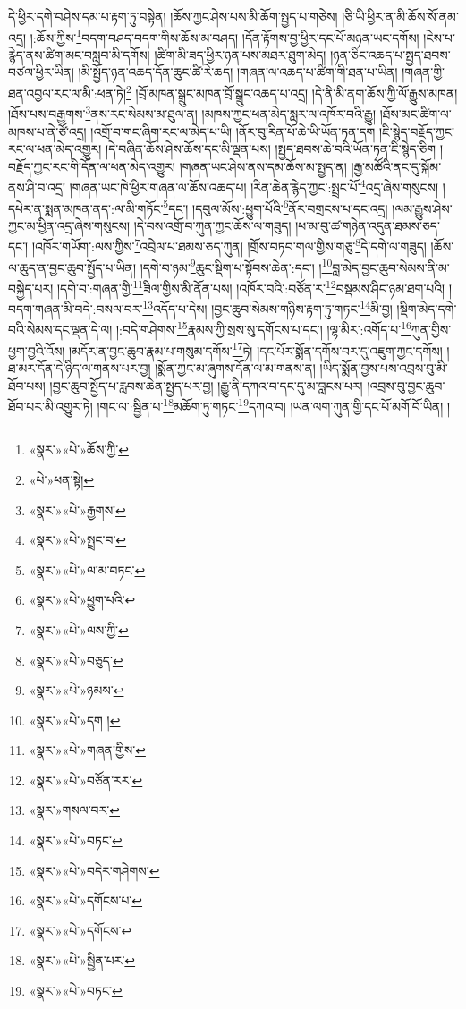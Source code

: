 དེ་ཕྱིར་དགེ་བཤེས་དམ་པ་རྟག་ཏུ་བསྟེན། །ཆོས་ཀྱང་ཤེས་པས་མི་ཆོག་སྤྱད་པ་གཅེས། །ཅི་ཡི་ཕྱིར་ན་མི་ཆོས་སོ་ནམ་འདྲ། །:ཆོས་ཀྱིས་\footnote{«སྣར་»«པེ་»ཆོས་ཀྱི་}བདག་བཤད་བདག་གིས་ཆོས་མ་བཤད། །དོན་རྟོགས་བྱ་ཕྱིར་དང་པོ་མཉན་ཡང་དགོས། །ངེས་པ་རྙེད་ནས་ཚིག་མང་བསླབ་མི་དགོས། །ཚིག་མི་ཟད་ཕྱིར་ཉན་པས་མཐར་ཐུག་མེད། །ཉན་ཅིང་འཆད་པ་སྤྱད་ཐབས་བཙལ་ཕྱིར་ཡིན། །མི་སྤྱོད་ཉན་འཆད་དོན་ཆུང་ཚི་རེ་ཆད། །གཞན་ལ་འཆད་པ་ཚིག་གི་ཐན་པ་ཡིན། །གཞན་གྱི་ཐན་འབྱལ་རང་ལ་མི་:ཕན་ཏེ།\footnote{«པེ་»ཕན་སྟེ།} །བྲོ་མཁན་སྒྲུང་མཁན་བྲོ་སྒྲུང་འཆད་པ་འདྲ། །དེ་ནི་མི་ནག་ཆོས་ཀྱི་ལོ་རྒྱུས་མཁན། །ཐོས་པས་བརྒྱགས་\footnote{«སྣར་»«པེ་»རྒྱགས་}ནས་རང་སེམས་མ་ཐུལ་ན། །མཁས་ཀྱང་ཕན་མེད་སླར་ལ་འཁོར་བའི་རྒྱུ། །ཐོས་མང་ཚིག་ལ་མཁས་པ་ནེ་ཙོ་འདྲ། །འགྲོ་བ་གང་ཞིག་རང་ལ་མེད་པ་ཡི། །ནོར་བུ་རིན་པོ་ཆེ་ཡི་ཡོན་ཏན་དག །ཇི་སྙེད་བརྗོད་ཀྱང་རང་ལ་ཕན་མེད་འགྱུར། །དེ་བཞིན་ཆོས་ཤེས་ཆོས་དང་མི་ལྡན་པས། །སྤྱད་ཐབས་ཆེ་བའི་ཡོན་ཏན་ཇི་སྙེད་ཅིག །བརྗོད་ཀྱང་རང་གི་དོན་ལ་ཕན་མེད་འགྱུར། །གཞན་ཡང་ཤེས་ནས་དམ་ཆོས་མ་སྤྱད་ན། །རྒྱ་མཚོའི་ནང་དུ་སྐོམ་ནས་ཤི་བ་འདྲ། །གཞན་ཡང་ཁེ་ཕྱིར་གཞན་ལ་ཆོས་འཆད་པ། །རིན་ཆེན་རྙེད་ཀྱང་:སྤྲང་པོ་\footnote{«སྣར་»«པེ་»སྤྲང་བ་}འདྲ་ཞེས་གསུངས། །དཔེར་ན་སྨན་མཁན་ནད་:ལ་མི་གཏོང་\footnote{«སྣར་»«པེ་»ལ་མ་བཏང་}དང་། །དབུལ་མོས་:ཕྱུག་པོའི་\footnote{«སྣར་»«པེ་»ཕྱུག་པའི་}ནོར་བགྲངས་པ་དང་འདྲ། །ལམ་རྒྱུས་ཤེས་ཀྱང་མ་ཕྱིན་འདྲ་ཞེས་གསུངས། །དེ་བས་འགྲོ་བ་ཀུན་ཀྱང་ཆོས་ལ་གཟུད། །ཕ་མ་བུ་ཚ་གཉེན་འདུན་ཐམས་ཅད་དང་། །འཁོར་གཡོག་:ལས་ཀྱིས་\footnote{«སྣར་»«པེ་»ལས་ཀྱི་}འབྲེལ་པ་ཐམས་ཅད་ཀུན། །གྲོས་བཏབ་གལ་གྱིས་གཅུ་\footnote{«སྣར་»«པེ་»བཅུད་}དེ་དགེ་ལ་གཟུད། །ཆོས་ལ་ཆུད་ན་བྱང་ཆུབ་སྤྱོད་པ་ཡིན། །དགེ་བ་ཉམ་\footnote{«སྣར་»«པེ་»ཉམས་}ཆུང་སྡིག་པ་སྟོབས་ཆེན་:དང་། །\footnote{«སྣར་»«པེ་»དག །}བླ་མེད་བྱང་ཆུབ་སེམས་ནི་མ་བསྐྱེད་པར། །དགེ་བ་:གཞན་གྱི་\footnote{«སྣར་»«པེ་»གཞན་གྱིས་}ཟིལ་གྱིས་མི་ནོན་པས། །འཁོར་བའི་:བཙོན་ར་\footnote{«སྣར་»«པེ་»བཙོན་རར་}བསྡམས་ཤིང་ཉམ་ཐག་པའི། །བདག་གཞན་མི་བདེ་:བསལ་བར་\footnote{«སྣར་»གསལ་བར་}འདོད་པ་དེས། །བྱང་ཆུབ་སེམས་གཉིས་རྟག་ཏུ་གཏང་\footnote{«སྣར་»«པེ་»བཏང་}མི་བྱ། །སྡིག་མེད་དགེ་བའི་སེམས་དང་ལྡན་དེ་ལ། །:བདེ་གཤེགས་\footnote{«སྣར་»«པེ་»བདེར་གཤེགས་}རྣམས་ཀྱི་སྲས་སུ་དགོངས་པ་དང་། །ལྷ་མིར་:འགོད་པ་\footnote{«སྣར་»«པེ་»དགོངས་པ་}ཀུན་གྱིས་ཕྱག་བྱའི་འོས། །མདོར་ན་བྱང་ཆུབ་རྣམ་པ་གསུམ་དགོས་\footnote{«སྣར་»«པེ་»དགོངས་}ཏེ། །དང་པོར་སྨོན་དགོས་བར་དུ་འཇུག་ཀྱང་དགོས། །ཐ་མར་དོན་དེ་ཉིད་ལ་གནས་པར་བྱ། །སྨོན་ཀྱང་མ་ཞུགས་དོན་ལ་མ་གནས་ན། །ཡིད་སྨོན་བྱས་པས་འབྲས་བུ་མི་ཐོབ་པས། །བྱང་ཆུབ་སྤྱོད་པ་རླབས་ཆེན་སྤྱད་པར་བྱ། །རྒྱུ་ནི་དཀའ་བ་དང་དུ་མ་བླངས་པར། །འབྲས་བུ་བྱང་ཆུབ་ཐོབ་པར་མི་འགྱུར་ཏེ། །གང་ལ་:སྦྱིན་པ་\footnote{«སྣར་»«པེ་»སྦྱིན་པར་}མཆོག་ཏུ་གཏང་\footnote{«སྣར་»«པེ་»བཏང་}དཀའ་བ། །ཡན་ལག་ཀུན་གྱི་དང་པོ་མགོ་བོ་ཡིན། །
